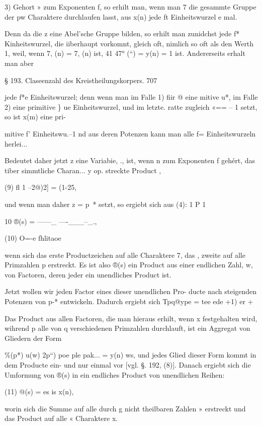 \documentclass[12pt,a4paper]{article}
\theoremstyle{plain}
\theoremstyle{definition}
\begin{document}
3) Gehort » zum Exponenten f, so erhilt man, wenn man 7 die gesammte Gruppe der pw Charaktere durchlaufen lasst, aus x(n) jede ft Einheitswurzel e mal.

Denn da die z eine Abel'sche Gruppe bilden, so erhilt man zunidchst jede f* Kinheitswurzel, die iiberhaupt vorkomnt, gleich oft, nimlich so oft als den Werth 1, weil, wenn 7, (n) = 7, (n) ist, 41 47° (``) = y(n) = 1 ist. Andererseits erhalt man aber

§ 193. Claseenzahl des Kreistheilungskorpers. 707

jede f*e Einheitswurzel; denn wenn man im Falle 1) fiir @ eine mitive u*, im Falle 2) eine primitive \} ue Einheitswurzel, und im letzte. ratte zugleich «== -- 1 setzt, so ist x(m) eine pri-

mitive f' Einheitswu.--1 nd aus deren Potenzen kann man alle f= Einheitswurzeln herlei...

Bedeutet daher jetzt z eine Variabie, ., ist, wenn n zum Exponenten f gehért, das tiber simmtliche Charan... y op. streckte Product ,

(9) fl 1 --2@)2] = (1-25,

und wenn man daher z = p~* setzt, so ergiebt sich aus (4): 1 P 1

10 ®(s) = ------\_ ----\_\_\_--\_.,

(10) O=-e fhlitaoe

wenn sich das erste Productzeichen auf alle Charaktere 7, das , zweite auf alle Primzahlen p erstreckt. Es ist also ®(s) ein Product aus einer endlichen Zahl, w, von Factoren, deren jeder ein unendliches Product ist.

Jetzt wollen wir jeden Factor eines dieser unendlichen Pro- ducte nach steigenden Potenzen von p-* entwickeln. Dadurch ergiebt sich Tpq@ype = tee ede +1) er +

Das Product aus allen Factoren, die man hieraus erhilt, wenn x festgehalten wird, wihrend p alle von q verschiedenen Primzahlen durchlauft, ist ein Aggregat von Gliedern der Form

\%(p*) u(w\texttrademark ) 2p``) poe ple pak... = y(n) ws, und jedes Glied dieser Form kommt in dem Producte ein- und nur einmal vor [vgl. §. 192, (8)]. Danach ergiebt sich die Umformung von ®(s) in ein endliches Product von unendlichen Reihen:

(11) @(s) = es is x(n),

worin sich die Summe auf alle durch g nicht theilbaren Zahlen » erstreckt und das Product auf alle « Charaktere x.
\end{document}
